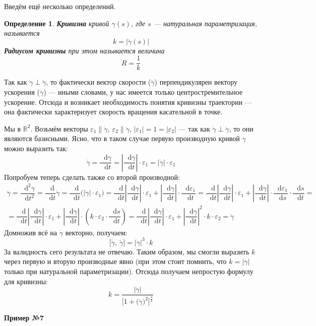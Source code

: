 \documentclass[a4paper,12pt]{article}
\newtheorem{definition}{Определение}
\newcommand{\R}{\mathbb{R}}
\renewcommand*\d{\mathop{}\!\mathrm{d}}
\newcommand{\e}{\varepsilon}
\begin{document}
Введём ещё несколько определений.
\begin{definition}
	\textbf{Кривизна} кривой $\gamma(s)$, где $s$ --- натуральная параметризация, называется 
	\[k = |\ddot \gamma(s)|\]
	\textbf{Радиусом кривизны} при этом называется величина
	\[R = \dfrac{1}{k}\]
\end{definition}
Так как $\dot \gamma \perp \ddot \gamma$, то фактически вектор скорости ($\dot \gamma$) перпендикулярен вектору ускорения ($\ddot \gamma$) --- иными словами, у нас имеется только центростремительное ускорение. Отсюда и возникает необходимость понятия кривизны траектории --- она фактически характеризует скорость вращения касательной в точке.

Мы в $\R^2$. Возьмём векторы $\e_1 \parallel\dot \gamma,\ \e_2 \parallel \ddot \gamma$, $|\e_1| = 1 = |\e_2|$ --- так как $\dot \gamma \perp \ddot \gamma$, то они являются базисными. Ясно, что в таком случае первую производную кривой $\gamma$ можно выразить так:
\[\dot\gamma = \dfrac{\d \gamma}{\d t} = \left|\dfrac{\d \gamma}{\d t}\right|\cdot \e_1 = |\dot{\gamma}|\cdot \e_1\]
Попробуем теперь сделать также со второй производной:
\begin{gather*}
	\ddot{\gamma} = \dfrac{\d^2\gamma}{\d t^2} = \dfrac{\d }{\d t}\dot{\gamma} = \dfrac{\d }{\d t}\big(|\dot{\gamma}|\cdot \e_1\big) = \dfrac{\d}{\d t}\left|\dfrac{\d \gamma}{\d t}\right|\cdot \e_1 + \left|\dfrac{\d \gamma}{\d t}\right| \cdot \dfrac{\d \e_1}{\d t} = \dfrac{\d}{\d t}\left|\dfrac{\d \gamma}{\d t}\right|\cdot \e_1 + \left|\dfrac{\d \gamma}{\d t}\right| \cdot \dfrac{\d \e_1}{\d s}\cdot \dfrac{\d s}{\d t} = \\
	= \dfrac{\d}{\d t}\left|\dfrac{\d \gamma}{\d t}\right|\cdot \e_1 + \left|\dfrac{\d \gamma}{\d t}\right| \cdot \left(k \cdot \e_2 \cdot \dfrac{\d s}{\d t}\right) = \dfrac{\d}{\d t}\left|\dfrac{\d \gamma}{\d t}\right|\cdot \e_1 + \left|\dfrac{\d \gamma}{\d t}\right|^2 \cdot k \cdot \e_2 = \ddot{\gamma}
\end{gather*}
Домножив всё на $\dot{\gamma}$ векторно, получаем:
\[\big[\dot{\gamma},\ \ddot\gamma\big] = |\dot{\gamma}|^3\cdot k\]
За валидность сего результата не отвечаю. Таким образом, мы смогли выразить $k$ через первую и вторую производные явно (при этом стоит помнить, что $k = |\ddot{\gamma}|$ только при натуральной параметризации). Отсюда получаем непростую формулу для кривизны:
\[k = \dfrac{|\ddot{\gamma}|}{\Big[1 + \big(\dot{\gamma}\big)^2\Big]^\frac{3}{2}}\]

\textbf{Пример №7}
\end{document}

